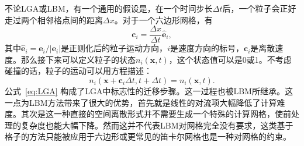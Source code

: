 不论LGA或LBM，有一个通用的假设是，在一个时间步长$\Delta t$后，一个粒子会正好走过两个相邻格点间的距离$\Delta x$。对于一个六边形网格，有
\begin{equation}
    \mathbf{c}_i=\frac{\Delta x}{\Delta t}\hat{\mathbf{e}}_i,
\end{equation}
其中$\hat{\mathbf{e}}_i=\mathbf{e}_i/|\mathbf{e}_i|$是正则化后的粒子运动方向，$i$是速度方向的标号，$\mathbf{c}_i$是离散速度。那么接下来可以定义粒子的状态$n_{i}(\mathbf{x},t)$，这个状态值可以是0或1。不考虑碰撞的话，粒子的运动可以用方程描述：
\begin{equation}
    n_{i}(\mathbf{x}+\mathbf{c}_i \Delta t,t+\Delta t)=n_{i}(\mathbf{x},t).
    \label{eq:LGA}
\end{equation}
公式~\ref{eq:LGA} 构成了LGA中标志性的迁移步骤。这一过程也被LBM所继承。这一点为LBM方法带来了很大的优势，首先就是线性的对流项大幅降低了计算难度。其次是这一种直接的空间离散形式并不需要生成一个特殊的计算网格，使前处理的复杂度也能大幅下降。然而这并不代表LBM对网格完全没有要求，这类基于格子的方法只能被应用于六边形或更常见的笛卡尔网格也是一种对网格的约束。

